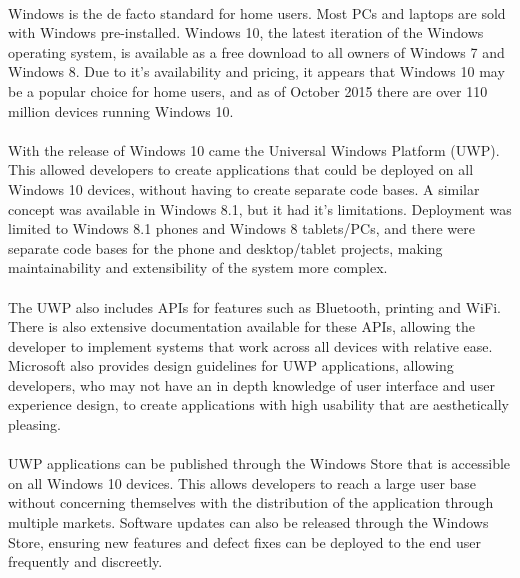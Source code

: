 		\paragraph{}{
		Windows is the de facto standard for home users. Most PCs and laptops are sold with Windows pre-installed. Windows 10, the latest iteration of the Windows operating system, is available as a free download to all owners of Windows 7 and Windows 8. Due to it's availability and pricing, it appears that Windows 10 may be a popular choice for home users, and as of October 2015 there are over 110 million devices running Windows 10.
		}
		\paragraph{}{
		With the release of Windows 10 came the Universal Windows Platform (UWP). This allowed developers to create applications that could be deployed on all Windows 10 devices, without having to create separate code bases. A similar concept was available in Windows 8.1, but it had it's limitations. Deployment was limited to Windows 8.1 phones and Windows 8 tablets/PCs, and there were separate code bases for the phone and desktop/tablet projects, making maintainability and extensibility of the system more complex.
		}
		\paragraph{}{
		The UWP also includes APIs for features such as Bluetooth, printing and WiFi. There is also extensive documentation available for these APIs, allowing the developer to implement systems that work across all devices with relative ease. Microsoft also provides design guidelines for UWP applications, allowing developers, who may not have an in depth knowledge of user interface and user experience design, to create applications with high usability that are aesthetically pleasing.
		}
		\paragraph{}{
		UWP applications can be published through the Windows Store that is accessible on all Windows 10 devices. This allows developers to reach a large user base without concerning themselves with the distribution of the application through multiple markets. Software updates can also be released through the Windows Store, ensuring new features and defect fixes can be deployed to the end user frequently and discreetly.
		}	
		
